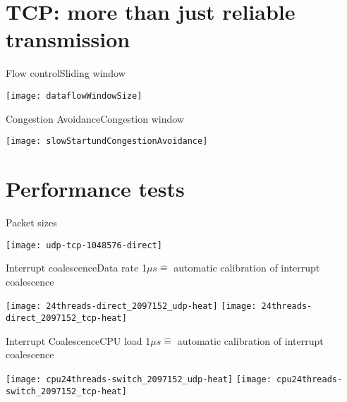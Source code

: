 \section{TCP: more than just reliable transmission}

\begin{frame}{Flow control}{Sliding window}
	\begin{center} 
	\texttt{[image: dataflowWindowSize]}
	\end{center} 
\end{frame}

\begin{frame}{Congestion Avoidance}{Congestion window}
	\begin{center} 
		\texttt{[image: slowStartundCongestionAvoidance]}
	\end{center} 
\end{frame}

\section{Performance tests}

\begin{frame}{Packet sizes}{}
	\begin{center}
	  \texttt{[image: udp-tcp-1048576-direct]}
	\end{center}
\end{frame}

\begin{frame}{Interrupt coalescence}{Data rate}
	1$\mu s \hat{=}$ automatic calibration of interrupt coalescence
	\begin{center} 
	\texttt{[image: 24threads-direct\_2097152\_udp-heat]}
	\texttt{[image: 24threads-direct\_2097152\_tcp-heat]}
	\end{center} 
\end{frame}
\begin{frame}{Interrupt Coalescence}{CPU load}
	1$\mu s \hat{=}$ automatic calibration of interrupt coalescence
	\begin{center} 
	\texttt{[image: cpu24threads-switch\_2097152\_udp-heat]}
	\texttt{[image: cpu24threads-switch\_2097152\_tcp-heat]}
	\end{center} 
\end{frame}

